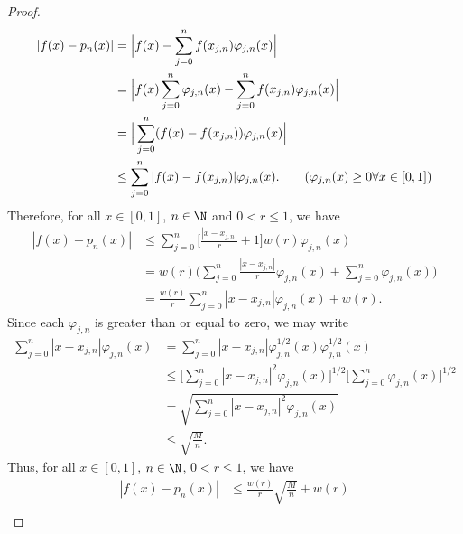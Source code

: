 \begin{proof}
\begin{align*}
        | f(x) - {p}_{n}(x)  | &= \Big| f(x) - \sum_{ j=0  }^{ n  } f({x}_{j,n}) {\varphi}_{j,n}(x)  \Big|  \\
                               &= \Big| f(x) \sum_{ j=0  }^{ n } {\varphi}_{j,n}(x) - \sum_{ j = 0  }^{ n } f({x}_{j,n}) {\varphi}_{j,n}(x)   \Big| \\
                               &= \Big| \sum_{ j= 0  }^{ n } (f(x) - f({x}_{j,n})) {\varphi}_{j,n}(x) \Big| \\
                               &\leq \sum_{ j=0  }^{ n } | f(x) - f({x}_{j,n})  | {\varphi}_{j,n}(x). \tag{\( {\varphi}_{j,n}(x) \geq 0 \forall x \in [0,1]  \)} 
    \end{align*}
    Therefore, for all \( x \in [0,1] \), \( n \in \N  \) and \( 0 < r \leq 1  \), we have 
    \begin{align*}
        | f(x) - {p}_{n}(x)  | &\leq \sum_{ j=0  }^{ n } \Big[ \frac{ | x - {x}_{j,n} |  }{ r  }  + 1 \Big] w (r) {\varphi}_{j,n}(x)  \\
                               &= w(r) \Big(  \sum_{ j=0  }^{ n } \frac{ | x - {x}_{j,n} |  }{ r  }  {\varphi}_{j,n}(x) + \sum_{ j=0  }^{ n } {\varphi}_{j,n}(x)  \Big) \\
                               &= \frac{ w(r) }{ r  }  \sum_{ j=0  }^{ n } | x- {x}_{j,n} |  {\varphi}_{j,n}(x) + w(r).
    \end{align*}
    Since each \( {\varphi}_{j,n} \) is greater than or equal to zero, we may write
    \begin{align*}
        \sum_{ j = 0   }^{ n } | x - {x}_{j,n} | {\varphi}_{j,n}(x)  &= \sum_{ j=0  }^{n}   | x - {x}_{j,n} |   {\varphi}_{j,n}^{1/2}(x) {\varphi}_{j,n}^{1/2}(x)  \\
                                                                     &\leq \Big[\sum_{ j=0  }^{ n } | x - {x}_{j,n} |^{2}  {\varphi}_{j,n}(x) \Big]^{1/2} \Big[ \sum_{ j= 0  }^{ n } {\varphi}_{j,n}(x)  \Big]^{1/2} \\
                                                                     &= \sqrt{ \sum_{ j=0  }^{ n } | x - {x}_{j,n} |^{2} {\varphi}_{j,n}(x) }  \\
                                                                     &\leq \sqrt{ \frac{ M }{ n }  }.
    \end{align*}
    Thus, for all \( x \in [0,1] \), \( n \in \N  \), \( 0 < r \leq 1  \), we have 
    \begin{align*}
        | f(x) - {p}_{n}(x) | &\leq \frac{ w(r) }{ r  }  \sqrt{  \frac{ M }{ n }  }  + w(r) \\

\end{align*}
\end{proof}
